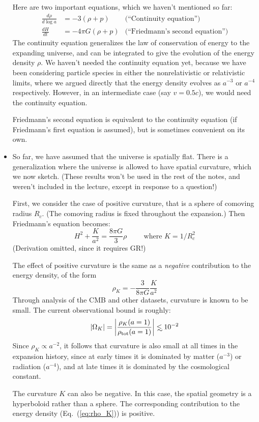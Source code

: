 \documentclass[aps,prd,superscriptaddress,groupedaddress,nofootinbib,nobibnotes]{revtex4}
\newcommand{\be}{\begin{equation}}
\newcommand{\ee}{\end{equation}}
\newcommand\lsim{\mathrel{\rlap{\lower4pt\hbox{\hskip1pt$\sim$}}
        \raise1pt\hbox{$<$}}}
\begin{document}
\begin{itemize}
Here are two important equations, which we haven't mentioned so far:
\begin{align}
\frac{d\rho}{d\log a} &= -3(\rho + p)  & \mbox{(``Continuity equation'')} \\
\frac{dH}{dt} &= -4\pi G (\rho + p) & \mbox{(``Friedmann's second equation'')}
\end{align}
The continuity equation generalizes the law of conservation of energy to the expanding
universe, and can be integrated to give the evolution of the energy density $\rho$.
We haven't needed the continuity equation yet, because we have been considering
particle species in either the nonrelativistic or relativistic limits, where we argued directly
that the energy density evolves as $a^{-3}$ or $a^{-4}$ respectively.  However, in an
intermediate case (say $v=0.5c$), we would need the continuity equation.

Friedmann's second equation is equivalent to the continuity equation (if Friedmann's
first equation is assumed), but is sometimes convenient on its own.

\item
So far, we have assumed that the universe is spatially flat.
There is a generalization where the universe is allowed to have spatial curvature,
which we now sketch.  (These results won't be used in the rest of the notes, and
weren't included in the lecture, except in response to a question!)

First, we consider the case of positive curvature, that is a sphere of
comoving radius $R_c$.  (The comoving radius is fixed throughout the
expansion.)  Then Friedmann's equation becomes:
\be
H^2 + \frac{K}{a^2} = \frac{8\pi G}{3} \rho
  \hspace{1cm}
\mbox{where $K = 1/R_c^2$}
\ee
(Derivation omitted, since it requires GR!)

The effect of positive curvature is the same as a {\em negative}
contribution to the energy density, of the form
\be
\rho_K = - \frac{3}{8\pi G} \frac{K}{a^2} \label{eq:rho_K}
\ee
Through analysis of the CMB and other datasets, curvature is known to be small.
The current observational bound is roughly:
\be
|\Omega_K| = \left| \frac{\rho_K(a=1)}{\rho_{\rm tot}(a=1)} \right| \lsim 10^{-2}
\ee
Since $\rho_K \propto a^{-2}$, it follows that curvature is also small at all times
in the expansion history, since at early times it is dominated by matter ($a^{-3}$)
or radiation ($a^{-4}$), and at late times it is dominated by the cosmological constant.

The curvature $K$ can also be negative.  In this case, the spatial geometry is a
hyperboloid rather than a sphere.  The corresponding contribution to the energy
density (Eq.~(\ref{eq:rho_K})) is positive.

\end{itemize}
\end{document}
